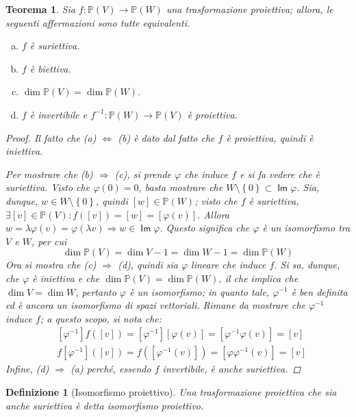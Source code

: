 \documentclass[11pt]{scrartcl}
\theoremstyle{style1}
\newtheorem{teorema}{Teorema}[section]
\newtheorem{definizione}{Definizione}[section]
\numberwithin{equation}{subsection}
\renewcommand{\operatorname}[1]{\mathop{\mathrm{\textsf{#1}}}}
\begin{document}
\begin{teorema}
	Sia $f:\mathbb{P}(V)\to \mathbb{P}(W)$ una trasformazione proiettiva; allora, le seguenti affermazioni sono tutte equivalenti.
	\begin{enumerate}[(a).]
		\item $f$ \`e suriettiva.
		\item $f$ \`e biettiva.
		\item $\dim \mathbb{P}(V) = \dim\mathbb{P}(W)$.
		\item $f$ \`e invertibile e $f^{-1} : \mathbb{P}(W) \to \mathbb{P}(V)$ \`e proiettiva.
	\end{enumerate}
	\begin{proof}
		Il fatto che (a) $\iff$ (b) \`e dato dal fatto che $f$ \`e proiettiva, quindi \`e iniettiva.

Per mostrare che (b) $\Rightarrow $ (c), si prende $\varphi $ che induce $f$ e si fa vedere che \`e suriettiva.
Visto che $\varphi (0) = 0$, basta mostrare che $W\setminus \left\{ 0 \right\} \subset \operatorname{Im} \varphi $.
Sia, dunque, $w \in W \setminus \left\{ 0 \right\} $, quindi $[w] \in \mathbb{P}(W)$; visto che $f$ \`e suriettiva, $\exists [v] \in \mathbb{P}(V) : f([v]) = [w] = [\varphi (v)]$. 
Allora $w = \lambda \varphi (v) = \varphi (\lambda v) \Rightarrow w \in \operatorname{Im} \varphi $.
Questo significa che $\varphi $ \`e un isomorfismo tra $V$ e $W$, per cui
\[
\dim \mathbb{P}(V) = \dim V - 1 = \dim W -1 = \dim \mathbb{P}(W)
\] 
Ora si mostra che (c) $\Rightarrow $ (d), quindi sia $\varphi $ lineare che induce $f$. 
Si sa, dunque, che $\varphi $ \`e iniettiva e che $\dim \mathbb{P}(V) = \dim \mathbb{P}(W)$, il che implica che $\dim V = \dim W$, pertanto $\varphi $ \`e un isomorfismo; in quanto tale, $\varphi ^{-1} $ \`e ben definita ed \`e ancora un isomorfismo di spazi vettoriali.
Rimane da mostrare che $\varphi ^{-1} $ induce $f$; a questo scopo, si nota che:
\[
\begin{split}
	&[\varphi ^{-1} ] f([v]) = [\varphi ^{-1} ][\varphi (v)] = [\varphi ^{-1} \varphi (v)] = [v]\\
	&f[\varphi ^{-1} ]([v]) = f \left([\varphi ^{-1} (v)]\right) =[\varphi \varphi ^{-1} (v)] = [v]
\end{split}
\] 
Infine, (d) $\Rightarrow $ (a) perch\'e, essendo $f$ invertibile, \`e anche suriettiva.
	\end{proof}
\end{teorema}
\begin{definizione}
	[Isomorfismo proiettivo]
	Una trasformazione proiettiva che sia anche suriettiva \`e detta \textit{isomorfismo proiettivo}.
\end{definizione}
\end{document}

